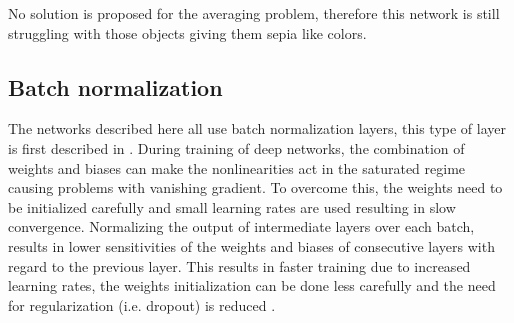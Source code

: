 No solution is proposed for the averaging problem, therefore this network is still struggling with those objects giving them sepia like colors. 


\subsection{Batch normalization}\label{sec:batch_norm}
The networks described here all use batch normalization layers, this type of layer is first described in \cite{ioffe2015batch}. During training of deep networks, the combination of weights and biases can make the nonlinearities act in the saturated regime causing problems with vanishing gradient. To overcome this, the weights need to be initialized carefully and small learning rates are used resulting in slow convergence. Normalizing the output of intermediate layers over each batch, results in lower sensitivities of the weights and biases of consecutive layers with regard to the previous layer. This results in faster training due to increased learning rates, the weights initialization can be done less carefully and the need for regularization (i.e. dropout) is reduced \cite{ioffe2015batch}. 


